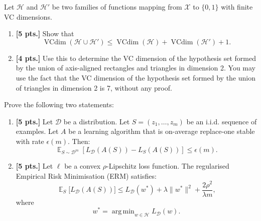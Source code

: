 \documentclass[11pt,a4paper]{article}
\DeclareMathOperator*{\argmin}{arg\,min}
\DeclareMathOperator{\E}{\mathbb{E}}
\DeclareMathOperator{\VCdim}{VCdim}
\newcommand{\examstatement}[1]{%
  \par\addvspace{0.85em}%
  \noindent{\bfseries #1}\par\nobreak\addvspace{0.28em}%
}
\theoremstyle{definition}
\begin{document}
\examstatement{Problem 3. [9 pts.]}
Let $\mathcal{H}$ and $\mathcal{H}'$ be two families of functions mapping from $\mathcal{X}$ to $\{0, 1\}$ with finite VC dimensions.
\begin{enumerate}[label=(\alph*)]
    \item \textbf{[5 pts.]} Show that
    \[
    \VCdim(\mathcal{H} \cup \mathcal{H}') \le \VCdim(\mathcal{H}) + \VCdim(\mathcal{H}') + 1.
    \]
    \item \textbf{[4 pts.]} Use this to determine the VC dimension of the hypothesis set formed by the union of axis-aligned rectangles and triangles in dimension 2. You may use the fact that the VC dimension of the hypothesis set formed by the union of triangles in dimension 2 is 7, without any proof.
\end{enumerate}

\examstatement{Problem 4. [10 pts.]}
Prove the following two statements:
\begin{enumerate}[label=(\alph*)]
    \item \textbf{[5 pts.]} Let $\mathcal{D}$ be a distribution. Let $S = (z_1, \dots, z_m)$ be an i.i.d. sequence of examples. Let $A$ be a learning algorithm that is on-average replace-one stable with rate $\epsilon(m)$. Then:
    \[
    \E_{S \sim \mathcal{D}^m} \left[ L_{\mathcal{D}}(A(S)) - L_S(A(S)) \right] \le \epsilon(m).
    \]
    \item \textbf{[5 pts.]} Let $\ell$ be a convex $\rho$-Lipschitz loss function. The regularised Empirical Risk Minimisation (ERM) satisfies:
    \[
    \E_S \bigl[ L_{\mathcal{D}}(A(S)) \bigr] \le L_{\mathcal{D}}(w^*) + \lambda \|w^*\|^2 + \frac{2\rho^2}{\lambda m},
    \]
    where
    \[
    w^* = \argmin_{w \in \mathcal{H}} L_{\mathcal{D}}(w).
    \]
\end{enumerate}

\par
\end{document}
